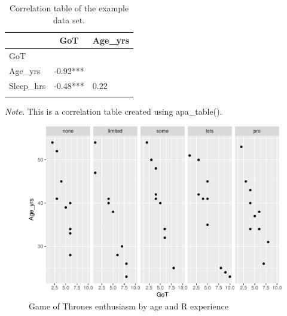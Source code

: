 \documentclass[english,man]{apa6}
\theoremstyle{definition}
\theoremstyle{definition}
\theoremstyle{remark}
\begin{document}
\begin{table}[tbp]
\begin{center}
\begin{threeparttable}
\caption{\label{tab:apa-corr-table}Correlation table of the example data set.}
\begin{tabular}{lll}
\toprule
 & \multicolumn{1}{c}{GoT} & \multicolumn{1}{c}{Age\_yrs}\\
\midrule
GoT &  & \\
Age\_yrs & -0.92*** & \\
Sleep\_hrs & -0.48*** & 0.22\\
\bottomrule
\addlinespace
\end{tabular}
\begin{tablenotes}[para]
\textit{Note.} This is a correlation table created using apa\_table().
\end{tablenotes}
\end{threeparttable}
\end{center}
\end{table}

\begin{figure}
\centering
\includegraphics{gilmore-lebreton-hallquist_files/figure-latex/GoT-by-age-exp-1.pdf}
\caption{\label{fig:GoT-by-age-exp}Game of Thrones enthusiasm by age and R
experience}
\end{figure}
\end{document}
